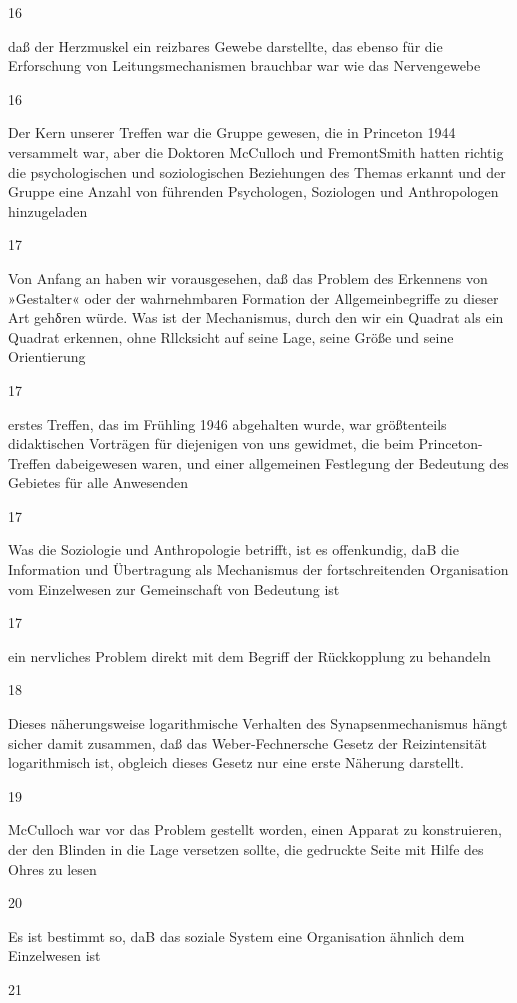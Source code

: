 \documentclass[
  letterpaper,
  DIV=11,
  numbers=noendperiod]{scrartcl}
\begin{document}
16

daß der Herzmuskel ein reizbares Gewebe darstellte, das ebenso für die
Erforschung von Leitungsmechanismen brauchbar war wie das Nervengewebe

16

Der Kern unserer Treffen war die Gruppe gewesen, die in Princeton 1944
versammelt war, aber die Doktoren McCulloch und FremontSmith hatten
richtig die psychologischen und soziologischen Beziehungen des Themas
erkannt und der Gruppe eine Anzahl von führenden Psychologen, Soziologen
und Anthropologen hinzugeladen

17

Von Anfang an haben wir vorausgesehen, daß das Problem des Erkennens von
»Gestalter« oder der wahrnehmbaren Formation der Allgemeinbegriffe zu
dieser Art gehδren würde. Was ist der Mechanismus, durch den wir ein
Quadrat als ein Quadrat erkennen, ohne Rllcksicht auf seine Lage, seine
Größe und seine Orientierung

17

erstes Treffen, das im Frühling 1946 abgehalten wurde, war größtenteils
didaktischen Vorträgen für diejenigen von uns gewidmet, die beim
Princeton-Treffen dabeigewesen waren, und einer allgemeinen Festlegung
der Bedeutung des Gebietes für alle Anwesenden

17

Was die Soziologie und Anthropologie betrifft, ist es offenkundig, daB
die Information und Übertragung als Mechanismus der fortschreitenden
Organisation vom Einzelwesen zur Gemeinschaft von Bedeutung ist

17

ein nervliches Problem direkt mit dem Begriff der Rückkopplung zu
behandeln

18

Dieses näherungsweise logarithmische Verhalten des Synapsenmechanismus
hängt sicher damit zusammen, daß das Weber-Fechnersche Gesetz der
Reizintensität logarithmisch ist, obgleich dieses Gesetz nur eine erste
Näherung darstellt.

19

McCulloch war vor das Problem gestellt worden, einen Apparat zu
konstruieren, der den Blinden in die Lage versetzen sollte, die
gedruckte Seite mit Hilfe des Ohres zu lesen

20

Es ist bestimmt so, daB das soziale System eine Organisation ähnlich dem
Einzelwesen ist

21
\end{document}
